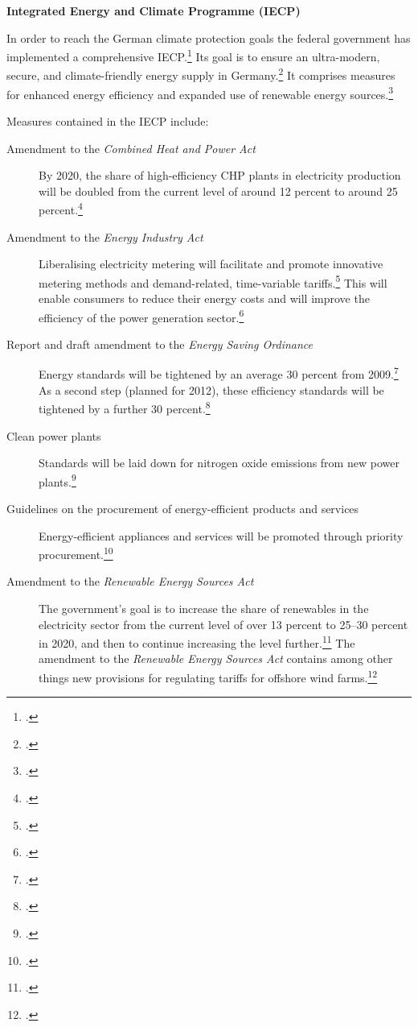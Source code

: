 \documentclass[10pt]{article}
\begin{document}
\textbf{Integrated Energy and Climate Programme (IECP)}



In order to reach the German climate protection goals the federal government has implemented a comprehensive IECP.\footcite[][]{GermanyIECP}
Its goal is to ensure an ultra-modern, secure, and climate-friendly energy supply in Germany.\footcite[][]{GermanyIECP}
It comprises measures for enhanced energy efficiency and expanded use of renewable energy sources.\footcite[][]{GermanyIECP}



Measures contained in the IECP include:
\begin{description}
	\item[Amendment to the \emph{Combined Heat and Power Act}] By 2020, the share of high-efficiency CHP plants in electricity production will be doubled from the current level of around 12 percent to around 25 percent.\footcite[][]{BMUprogramme}
	\item[Amendment to the \emph{Energy Industry Act}] Liberalising electricity metering will facilitate and promote innovative metering methods and demand-related, time-variable tariffs.\footcite[][]{BMUprogramme}
	This will enable consumers to reduce their energy costs and will improve the efficiency of the power generation sector.\footcite[][]{BMUprogramme}
	\item[Report and draft amendment to the \emph{Energy Saving Ordinance}] Energy standards will be tightened by an average 30 percent from 2009.\footcite[][]{BMUprogramme}
	As a second step (planned for 2012), these efficiency standards will be tightened by a further 30 percent.\footcite[][]{BMUprogramme}
	\item[Clean power plants] Standards will be laid down for nitrogen oxide emissions from new power plants.\footcite[][]{BMUprogramme}
	\item[Guidelines on the procurement of energy-efficient products and services] Energy-efficient appliances and services will be promoted through priority procurement.\footcite[][]{BMUprogramme}
	\item[Amendment to the \emph{Renewable Energy Sources Act}] The government’s goal is to increase the share of renewables in the electricity sector from the current level of over 13 percent to 25--30 percent in 2020, and then to continue increasing the level further.\footcite[][]{BMUprogramme}
	The amendment to the \emph{Renewable Energy Sources Act} contains among other things new provisions for regulating tariffs for offshore wind farms.\footcite[][]{BMUprogramme}

\end{description}
\end{document}
